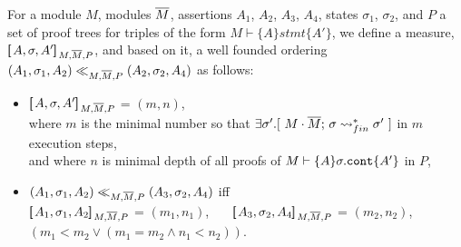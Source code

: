 \begin{definition}
For a module $M$, modules $\overline{M}$, assertions $A_1$, $A_2$, $A_3$, $A_4$, states $\sigma_1$, $\sigma_2$, and   $P$ a set of proof trees for triples of the form 
$M \vdash \{ A \} stmt  \{ A' \} $,  we define a measure, $[\!\![\, A, \sigma,A' ]\!\!]\,_{M,\overline{M},P} $, and based on it, a well founded ordering $(A_1,\sigma_1,A_2) \ll_{M,\overline{M},P}  (A_2,\sigma_2,A_4)$
as follows:
\begin{itemize}
\item
 $[\!\![\, A, \sigma,A' ]\!\!]\,_{M,\overline{M},P} $ = $(m, n)$, \\
 where $m$ is the minimal number so that $\exists \sigma'.[\ \leadstoBoundedStarFin {M\cdot \Mtwo} {\sigma}    {\sigma'}\ ]$ in $m$ execution steps, \\
 and where $n$ is minimal depth of all proofs of $M \vdash \{ A \} \sigma.\mbox{\normalfont{\texttt{cont}}}  \{ A' \} $ in $P$,
\item
$(A_1,\sigma_1,A_2) \ll_{M,\overline{M},P}  (A_3,\sigma_2,A_4)$ iff
\\
$[\!\![\, A_1, \sigma_1,A_2 ]\!\!]\,_{M,\overline{M},P} $ = $(m_1, n_1)$, \ \   \ $[\!\![\, A_3, \sigma_2,A_4 ]\!\!]\,_{M,\overline{M},P} $ = $(m_2, n_2)$, \ \ \  $(m_1<m_2 \vee  (m_1=m_2  \wedge  n_1 < n_2))$.
\end{itemize}
\end{definition}

%

